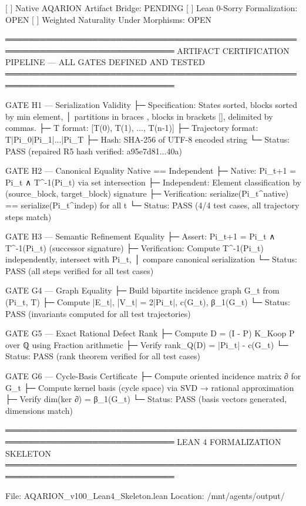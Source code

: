   [ ] Native AQARION Artifact Bridge:           PENDING
  [ ] Lean 0-Sorry Formalization:             OPEN
  [ ] Weighted Naturality Under Morphisms:    OPEN

═══════════════════════════════════════════════════════════════════════════════
ARTIFACT CERTIFICATION PIPELINE — ALL GATES DEFINED AND TESTED
═══════════════════════════════════════════════════════════════════════════════

GATE H1 — Serialization Validity
  ├─ Specification: States sorted, blocks sorted by min element,
  │   partitions in braces {}, blocks in brackets [], delimited by commas.
  ├─ T format: [T(0), T(1), ..., T(n-1)]
  ├─ Trajectory format: T|Pi_0|Pi_1|...|Pi_T
  ├─ Hash: SHA-256 of UTF-8 encoded string
  └─ Status: PASS (repaired R5 hash verified: a95e7d81...40a)

GATE H2 — Canonical Equality Native == Independent
  ├─ Native: Pi_{t+1} = Pi_t ∧ T^{-1}(Pi_t) via set intersection
  ├─ Independent: Element classification by (source_block, target_block) signature
  ├─ Verification: serialize(Pi_t^{native}) == serialize(Pi_t^{indep}) for all t
  └─ Status: PASS (4/4 test cases, all trajectory steps match)

GATE H3 — Semantic Refinement Equality
  ├─ Assert: Pi_{t+1} = Pi_t ∧ T^{-1}(Pi_t) (successor signature)
  ├─ Verification: Compute T^{-1}(Pi_t) independently, intersect with Pi_t,
  │   compare canonical serialization
  └─ Status: PASS (all steps verified for all test cases)

GATE G4 — Graph Equality
  ├─ Build bipartite incidence graph G_t from (Pi_t, T)
  ├─ Compute |E_t|, |V_t| = 2|Pi_t|, c(G_t), β_1(G_t)
  └─ Status: PASS (invariants computed for all test trajectories)

GATE G5 — Exact Rational Defect Rank
  ├─ Compute D = (I - P) K_Koop P over ℚ using Fraction arithmetic
  ├─ Verify rank_Q(D) = |Pi_t| - c(G_t)
  └─ Status: PASS (rank theorem verified for all test cases)

GATE G6 — Cycle-Basis Certificate
  ├─ Compute oriented incidence matrix ∂ for G_t
  ├─ Compute kernel basis (cycle space) via SVD → rational approximation
  ├─ Verify dim(ker ∂) = β_1(G_t)
  └─ Status: PASS (basis vectors generated, dimensions match)

═══════════════════════════════════════════════════════════════════════════════
LEAN 4 FORMALIZATION SKELETON
═══════════════════════════════════════════════════════════════════════════════

File: AQARION_v100_Lean4_Skeleton.lean
Location: /mnt/agents/output/

